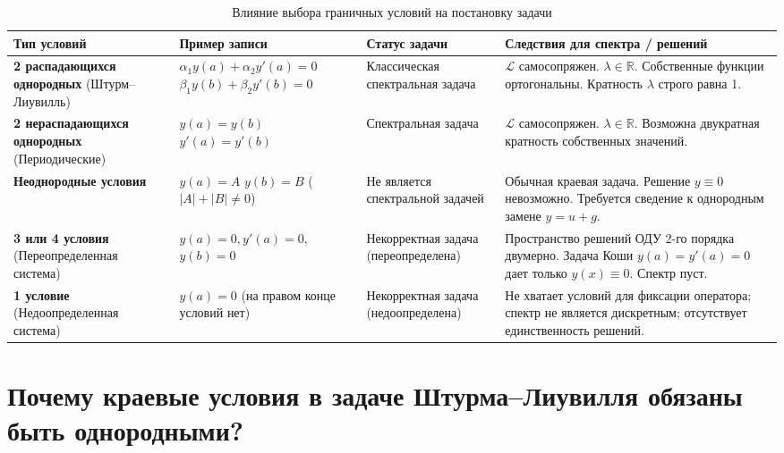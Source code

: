 \documentclass[12pt,a4paper]{article}
\begin{document}
\begin{table}[h!]
\small
\centering
\caption{Влияние выбора граничных условий на постановку задачи}
\label{tab:BC_classification}
\vspace{0.5em}
\begin{tabularx}{\textwidth}{p{3.5cm} p{3.2cm} p{2.8cm} X}
\toprule
\textbf{Тип условий} & \textbf{Пример записи} & \textbf{Статус задачи} & \textbf{Следствия для спектра / решений} \\
\midrule
\textbf{2 распадающихся однородных} (Штурм--Лиувилль) & $\alpha_1 y(a) + \alpha_2 y'(a) = 0$ $\beta_1 y(b) + \beta_2 y'(b) = 0$ & Классическая спектральная задача & $\mathcal{L}$ самосопряжен. $\lambda \in \mathbb{R}$. Собственные функции ортогональны. Кратность $\lambda$ строго равна 1. \\
\midrule
\textbf{2 нераспадающихся однородных} (Периодические) & $y(a) = y(b)$ $y'(a) = y'(b)$ & Спектральная задача & $\mathcal{L}$ самосопряжен. $\lambda \in \mathbb{R}$. Возможна двукратная кратность собственных значений. \\
\midrule
\textbf{Неоднородные условия} & $y(a) = A$ $y(b) = B$ ($|A|+|B| \neq 0$) & Не является спектральной задачей & Обычная краевая задача. Решение $y \equiv 0$ невозможно. Требуется сведение к однородным замене $y = u + g$. \\
\midrule
\textbf{3 или 4 условия} (Переопределенная система) & $y(a) = 0, y'(a) = 0,$ $y(b) = 0$ & Некорректная задача (переопределена) & Пространство решений ОДУ 2-го порядка двумерно. Задача Коши $y(a)=y'(a)=0$ дает только $y(x) \equiv 0$. Спектр пуст. \\
\midrule
\textbf{1 условие} (Недоопределенная система) & $y(a) = 0$ (на правом конце условий нет) & Некорректная задача (недоопределена) & Не хватает условий для фиксации оператора; спектр не является дискретным; отсутствует единственность решений. \\
\bottomrule
\end{tabularx}
\end{table}

\section{Почему краевые условия в задаче Штурма--Лиувилля обязаны быть однородными?}
\end{document}

